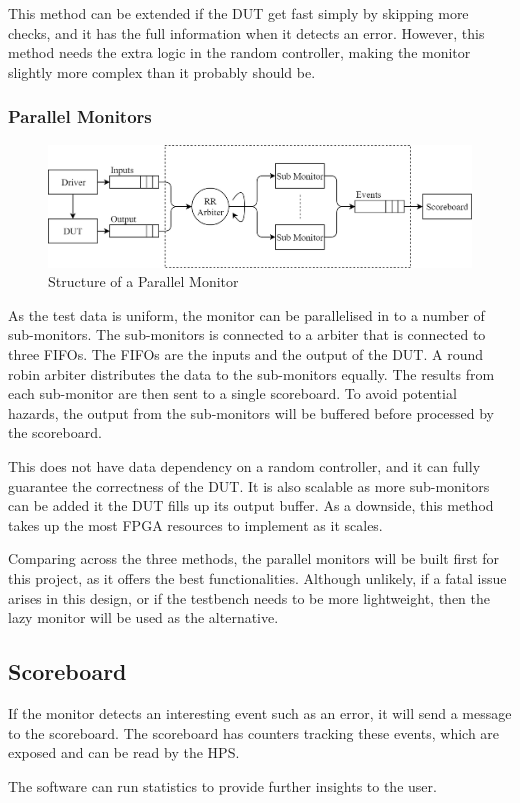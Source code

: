 This method can be extended if the DUT get fast simply by skipping more checks, and it has the full information when it detects an error.
However, this method needs the extra logic in the random controller, making the monitor slightly more complex than it probably should be.

\subsubsection{Parallel Monitors}

\begin{figure}[H]
  \centering
  \includegraphics[width=15cm]{img/ParMon}
  \caption{Structure of a Parallel Monitor}
  \label{ParMon}
\end{figure}

As the test data is uniform, the monitor can be parallelised in to a number of sub-monitors.
The sub-monitors is connected to a arbiter that is connected to three FIFOs.
The FIFOs are the inputs and the output of the DUT.
A round robin arbiter distributes the data to the sub-monitors equally.
The results from each sub-monitor are then sent to a single scoreboard.
To avoid potential hazards, the output from the sub-monitors will be buffered before processed by the scoreboard.

This does not have data dependency on a random controller, and it can fully guarantee the correctness of the DUT.
It is also scalable as more sub-monitors can be added it the DUT fills up its output buffer.
As a downside, this method takes up the most FPGA resources to implement as it scales.

Comparing across the three methods, the parallel monitors will be built first for this project, as it offers the best functionalities.
Although unlikely, if a fatal issue arises in this design, or if the testbench needs to be more lightweight, then the lazy monitor will be used as the alternative.

\subsection{Scoreboard}

If the monitor detects an interesting event such as an error, it will send a message to the scoreboard.
The scoreboard has counters tracking these events, which are exposed and can be read by the HPS.

The software can run statistics to provide further insights to the user.

